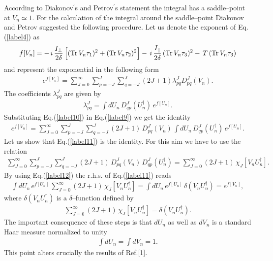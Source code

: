 \documentclass[a4paper,11pt]{article}
\begin{document}
According to Diakonov$^{\prime}$s and Petrov$^{\prime}$s statement the
integral has a saddle--point at $V_n \simeq 1$. For the calculation of
the integral around the saddle--point Diakonov and Petrov suggested
the following procedure. Let us denote the exponent of
Eq.(\ref{label4}) as
%
\begin{eqnarray}\label{label8}
f[V_n] = -\,i\,\frac{I_{\perp}}{2\delta}\,\Big[({\rm Tr}\,V_n\tau_1)^2 +
({\rm Tr}\,V_n\tau_2)^2\Big] - \,i\,\frac{I_{\parallel}}{2\delta}\,({\rm
Tr}\,V_n\tau_3)^2 -\,T\,({\rm Tr}\,V_n\tau_3) 
\end{eqnarray}
%
and represent the exponential in the following form
%
\begin{eqnarray}\label{label9}
e^{\textstyle f[V_n]} =
\sum^{\infty}_{J=0}\sum^{J}_{p=-J}\sum^{J}_{q=-J}(2J +
1)\lambda^J_{pq}D^J_{pq}(V_n).
\end{eqnarray}
%
The coefficients $\lambda^J_{pq}$ are given by
%
\begin{eqnarray}\label{label10}
\lambda^J_{pq} = \int dU_n\,D^J_{qp}(U^{\dagger}_n)\,e^{\textstyle f[U_n]}.
\end{eqnarray}
%
Substituting Eq.(\ref{label10}) in Eq.(\ref{label9}) we get the identity
%
\begin{eqnarray}\label{label11}
e^{\textstyle f[V_n]} =
\sum^{\infty}_{J=0}\sum^{J}_{p=-J}\sum^{J}_{q=-J}(2J +
1)\,D^J_{pq}(V_n)\, \int dU_n\,D^J_{qp}(U^{\dagger}_n)\,e^{\textstyle
f[U_n]}.
\end{eqnarray}
%
Let us show that Eq.(\ref{label11}) is the identity. For this aim we
have to use the relation
%
\begin{eqnarray}\label{label12}
\sum^{\infty}_{J=0}\sum^{J}_{p=-J}\sum^{J}_{q=-J}(2J + 1)\,
D^J_{pq}(V_n)\,D^J_{qp}(U^{\dagger}_n) =
\sum^{\infty}_{J=0}(2J+1)\,\chi_J[V_nU^{\dagger}_n].
\end{eqnarray}
%
By using Eq.(\ref{label12}) the r.h.s. of Eq.(\ref{label11}) reads
%
\begin{eqnarray}\label{label13}
\int dU_n\,e^{\textstyle
f[U_n]}\,\sum^{\infty}_{J=0}(2J+1)\,\chi_J[V_nU^{\dagger}_n] = \int
dU_n\,e^{\textstyle f[U_n]}\,\delta(V_nU^{\dagger}_n) = e^{\textstyle
f[V_n]},
\end{eqnarray}
%
where $\delta(V_nU^{\dagger}_n)$ is a $\delta$--function defined by 
%
\begin{eqnarray}\label{label14}
\sum^{\infty}_{J=0}(2J+1)\,\chi_J[V_nU^{\dagger}_n] =
\delta(V_nU^{\dagger}_n).
\end{eqnarray}
%
The important consequence of these steps is that $dU_n$ as well as
$dV_n$ is a standard Haar measure normalized to unity
%
\begin{eqnarray}\label{label15}
\int dU_n = \int dV_n = 1.
\end{eqnarray}
%
This point alters crucially the results of Ref.[1].
\end{document}
